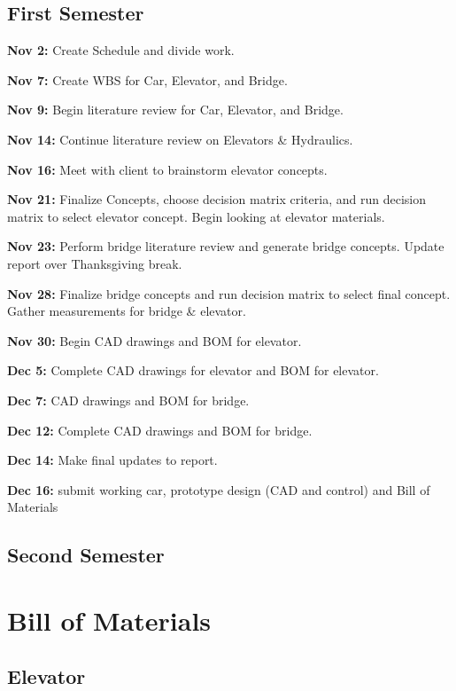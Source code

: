 \documentclass[fleqn,12pt]{project}
\begin{document}
\subsection{First Semester}
\noindent\textbf{Nov 2:} Create Schedule and divide work.

\noindent\textbf{Nov 7:} Create WBS for Car, Elevator, and Bridge. 

\noindent\textbf{Nov 9:} Begin literature review for Car, Elevator, and Bridge. 

\noindent\textbf{Nov 14:} Continue literature review on Elevators & Hydraulics. 

\noindent\textbf{Nov 16:} Meet with client to brainstorm elevator concepts. 

\noindent\textbf{Nov 21:} Finalize Concepts, choose decision matrix criteria, and run decision matrix to select elevator concept. Begin looking at elevator materials.

\noindent\textbf{Nov 23:} Perform bridge literature review and generate bridge concepts. Update report over Thanksgiving break. 

\noindent\textbf{Nov 28:} Finalize bridge concepts and run decision matrix to select final concept. Gather measurements for bridge & elevator. 

\noindent\textbf{Nov 30:} Begin CAD drawings and BOM for elevator. 

\noindent\textbf{Dec 5:} Complete CAD drawings for elevator and BOM for elevator. 

\noindent\textbf{Dec 7:} CAD drawings and BOM for bridge. 

\noindent\textbf{Dec 12:} Complete CAD drawings and BOM for bridge. 

\noindent\textbf{Dec 14:} Make final updates to report. 

\noindent\textbf{Dec 16:} submit working car, prototype design (CAD and control) and Bill of Materials

\subsection{Second Semester}

\section{Bill of Materials}
\subsection{Elevator}
\end{document}
